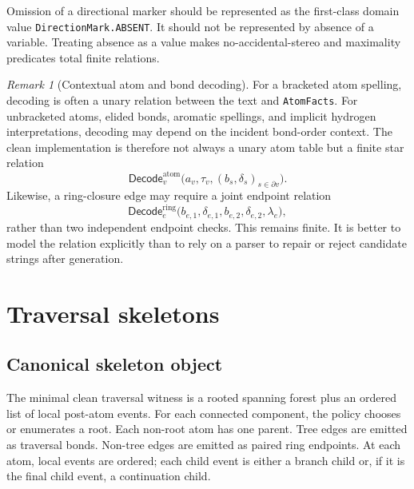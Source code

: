 \documentclass[10pt,a4paper]{article}
\newcommand{\Decode}{\mathsf{Decode}}
\theoremstyle{definition}
\theoremstyle{remark}
\newtheorem{remark}[lemma]{Remark}
\begin{document}
Omission of a directional marker should be represented as the first-class domain
value \texttt{DirectionMark.ABSENT}.  It should not be represented by absence of
a variable.  Treating absence as a value makes no-accidental-stereo and
maximality predicates total finite relations.

\begin{remark}[Contextual atom and bond decoding]
For a bracketed atom spelling, decoding is often a unary relation between the
text and \texttt{AtomFacts}.  For unbracketed atoms, elided bonds, aromatic
spellings, and implicit hydrogen interpretations, decoding may depend on the
incident bond-order context.  The clean implementation is therefore not always a
unary atom table but a finite star relation
\[
   \Decode^{\mathrm{atom}}_v
      \bigl(a_v,\tau_v,(b_s,\delta_s)_{s\in\partial v}\bigr).
\]
Likewise, a ring-closure edge may require a joint endpoint relation
\[
   \Decode^{\mathrm{ring}}_e
      \bigl(b_{e,1},\delta_{e,1},b_{e,2},\delta_{e,2},\lambda_e\bigr),
\]
rather than two independent endpoint checks.  This remains finite.  It is better
to model the relation explicitly than to rely on a parser to repair or reject
candidate strings after generation.
\end{remark}

\section{Traversal skeletons}
\label{s:skeletons}

\subsection{Canonical skeleton object}

The minimal clean traversal witness is a rooted spanning forest plus an ordered
list of local post-atom events.  For each connected component, the policy chooses
or enumerates a root.  Each non-root atom has one parent.  Tree edges are emitted
as traversal bonds.  Non-tree edges are emitted as paired ring endpoints.  At
each atom, local events are ordered; each child event is either a branch child or,
if it is the final child event, a continuation child.
\end{document}
